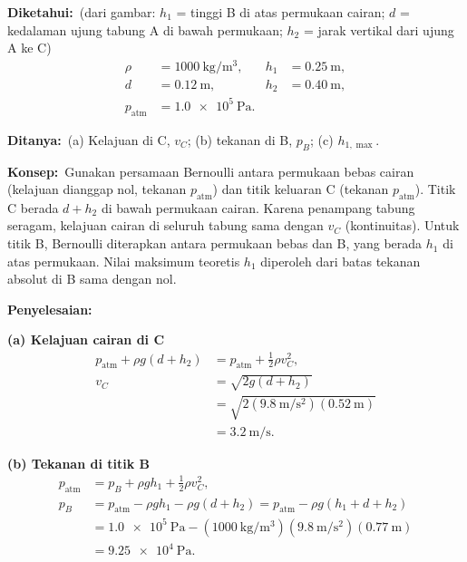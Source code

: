 \documentclass[12pt,a4paper]{article}
\newcommand{\diketahui}{\par\medskip\noindent\textbf{Diketahui:}}
\newcommand{\ditanya}{\par\medskip\noindent\textbf{Ditanya:}}
\newcommand{\konsep}{\par\medskip\noindent\textbf{Konsep:}}
\newcommand{\penyelesaian}{\par\medskip\noindent\textbf{Penyelesaian:}\par\nopagebreak}
\begin{document}
\diketahui\ (dari gambar: $h_1$ = tinggi B di atas permukaan cairan; $d$ = kedalaman ujung tabung A di bawah permukaan; $h_2$ = jarak vertikal dari ujung A ke C)
\begin{align*}
\rho &= \SI{1000}{\kilogram\per\metre\cubed},&
h_1 &= \SI{0,25}{\metre},\\
d &= \SI{0,12}{\metre},&
h_2 &= \SI{0,40}{\metre},\\
p_{\mathrm{atm}} &= \SI{1,0e5}{\pascal}.
\end{align*}
\ditanya\ (a) Kelajuan di C, $v_C$; (b) tekanan di B, $p_B$; (c) $h_{1,\max}$.

\konsep\ Gunakan persamaan Bernoulli antara permukaan bebas cairan (kelajuan dianggap nol, tekanan $p_{\mathrm{atm}}$) dan titik keluaran C (tekanan $p_{\mathrm{atm}}$). Titik C berada $d+h_2$ di bawah permukaan cairan. Karena penampang tabung seragam, kelajuan cairan di seluruh tabung sama dengan $v_C$ (kontinuitas). Untuk titik B, Bernoulli diterapkan antara permukaan bebas dan B, yang berada $h_1$ di atas permukaan. Nilai maksimum teoretis $h_1$ diperoleh dari batas tekanan absolut di B sama dengan nol.

\penyelesaian

\noindent\textbf{(a) Kelajuan cairan di C}
\begin{align*}
p_{\mathrm{atm}}+\rho g (d+h_2)
&=p_{\mathrm{atm}}+\frac12\rho v_C^2,\\
v_C&=\sqrt{2g(d+h_2)}\\
&=\sqrt{2(\SI{9,8}{\metre\per\second\squared})(\SI{0,52}{\metre})}\\
&=\SI{3,2}{\metre\per\second}.
\end{align*}

\noindent\textbf{(b) Tekanan di titik B}
\begin{align*}
p_{\mathrm{atm}}
&=p_B+\rho g h_1+\frac12\rho v_C^2,\\
p_B&=p_{\mathrm{atm}}-\rho g h_1-\rho g(d+h_2)
=p_{\mathrm{atm}}-\rho g(h_1+d+h_2)\\
&=\SI{1,0e5}{\pascal}
-(\SI{1000}{\kilogram\per\metre\cubed})
(\SI{9,8}{\metre\per\second\squared})(\SI{0,77}{\metre})\\
&=\SI{9,25e4}{\pascal}.
\end{align*}
\end{document}
